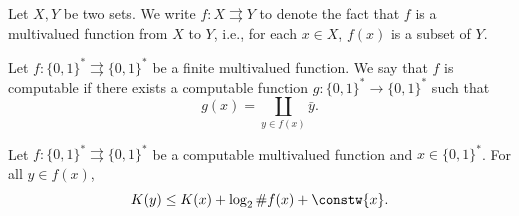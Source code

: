 
\begin{definition}

\end{definition}

\begin{definition}\label{def:multivalued_function}
    Let $X,Y$ be two sets. We write $f: X \rightrightarrows Y$ to denote the fact that $f$ is a multivalued function from $X$ to $Y$, i.e., for each $x \in X$, $f(x)$ is a subset of $Y$.
\end{definition}

\begin{definition}\label{def:computable_multivalued_function}
    Let $f: \{0,1\}^\ast \rightrightarrows \{0,1\}^\ast$ be a finite multivalued function. We say that $f$ is computable if there exists a computable function $g : \{0,1\}^\ast \to \{0,1\}^\ast$ such that 
    \begin{equation}
        g(x) = \coprod_{y \in f(x)} \bar{y}. 
    \end{equation}
\end{definition}


\begin{theorem}
    Let $f: \{0,1\}^\ast \rightrightarrows \{0,1\}^\ast$ be a computable multivalued function and $x \in \{0,1\}^\ast$. For all $y \in f(x)$,
    \begin{equation}
        K(y) \leq K(x) + \log_2 \#f(x) + \constw{x}.
    \end{equation}
\end{theorem}


